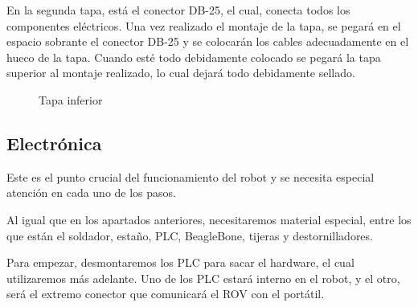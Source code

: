 En la segunda tapa, está el conector DB-25, el cual, conecta todos los componentes eléctricos. Una vez realizado el montaje de la tapa, se pegará en el espacio sobrante el conector DB-25 y se colocarán los cables adecuadamente en el hueco de la tapa. Cuando esté todo debidamente colocado se pegará la tapa superior al montaje realizado, lo cual dejará todo debidamente sellado.

\begin{figure}[hbtp]
  \begin{center}
  \end{center}
  \caption{Tapa inferior}
  \label{fig:tapa_iferior}
\end{figure}

\subsection{Electrónica}
\label{subsec:electronica}

Este es el punto crucial del funcionamiento del robot y se necesita especial atención en cada uno de los pasos. 

Al igual que en los apartados anteriores, necesitaremos material especial, entre los que están el soldador, estaño, PLC, BeagleBone, tijeras y destornilladores.

Para empezar, desmontaremos los PLC para sacar el hardware, el cual utilizaremos más adelante.
Uno de los PLC estará interno en el robot, y el otro, será el extremo conector que comunicará el ROV con el portátil.

